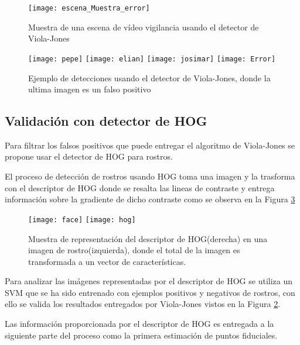 \begin{figure}[h]
\center
\texttt{[image: escena\_Muestra\_error]}
\caption{Muestra de  una escena de vídeo vigilancia usando el detector de Viola-Jones}
\label{im:EscenaViola}
\end{figure}

\begin{figure}[h]
\center
\texttt{[image: pepe]}
\texttt{[image: elian]}
\texttt{[image: josimar]}
\texttt{[image: Error]}
\caption{Ejemplo de detecciones usando el detector de Viola-Jones, donde la ultima imagen es un falso positivo}
\label{im:EscenaViolaResultados}
\end{figure}

\subsection{Validación con detector de \ac{HOG}}
Para filtrar los falsos positivos que puede entregar el algoritmo de Viola-Jones se propone usar el detector de \ac{HOG} para rostros. %

El proceso de detección de rostros usando \ac{HOG} toma una imagen y la trasforma con el descriptor de \ac{HOG} donde se resalta las lineas de contraste y entrega información sobre la gradiente de dicho contraste como se observa en la Figura \ref{im:HOG}

\begin{figure}[h]
\center
\texttt{[image: face]}
\texttt{[image: hog]}
\caption{Muestra de representación del descriptor de \ac{HOG}(derecha) en una imagen de rostro(izquierda), donde el total de la imagen es transformada a un vector de características.}
\label{im:HOG}
\end{figure}

Para analizar las imágenes representadas por el descriptor de \ac{HOG} se utiliza un \ac{SVM} que se ha sido entrenado con ejemplos positivos y negativos de rostros, con ello se valida los resultados entregados por Viola-Jones vistos en la Figura \ref{im:EscenaViolaResultados}.

Las información proporcionada por el descriptor de \ac{HOG} es entregada a la siguiente parte del proceso como la primera estimación de puntos fiduciales.


